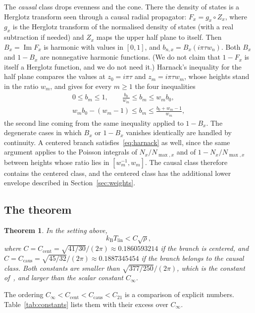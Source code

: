 \documentclass[10pt]{article}
\newtheorem{theorem}{Theorem}
\theoremstyle{remark}
\newcommand{\kB}{k_{\mathrm B}}
\newcommand{\Tlin}{T_{\mathrm{lin}}}
\newcommand{\Cinf}{C_\infty}
\newcommand{\Ccent}{C_{\mathrm{cent}}}
\newcommand{\Ccaus}{C_{\mathrm{caus}}}
\begin{document}
The \emph{causal} class drops evenness and the cone. There the density of states is a Herglotz transform seen through a causal radial propagator: $F_x=g_x\circ Z_x$, where $g_x$ is the Herglotz transform of the normalised density of states (with a real subtraction if needed) and $Z_x$ maps the upper half plane to itself. Then $B_x=\operatorname{Im}F_x$ is harmonic with values in $[0,1]$, and $b_{n,x}=B_x(i\pi\tau w_n)$. Both $B_x$ and $1-B_x$ are nonnegative harmonic functions. (We do not claim that $1-F_x$ is itself a Herglotz function, and we do not need it.) Harnack's inequality for the half plane compares the values at $z_0=i\pi\tau$ and $z_m=i\pi\tau w_m$, whose heights stand in the ratio $w_m$, and gives for every $m\ge1$ the four inequalities
\begin{equation}\label{eq:harnack}
\begin{gathered}
0\le b_m\le1,\qquad \frac{b_0}{w_m}\le b_m\le w_mb_0,\\
w_mb_0-(w_m-1)\le b_m\le\frac{b_0+w_m-1}{w_m},
\end{gathered}
\end{equation}
the second line coming from the same inequality applied to $1-B_x$. The degenerate cases in which $B_x$ or $1-B_x$ vanishes identically are handled by continuity. A centered branch satisfies~\eqref{eq:harnack} as well, since the same argument applies to the Poisson integrals of $N_x/N_{\max,x}$ and of $1-N_x/N_{\max,x}$ between heights whose ratio lies in $[w_m^{-1},w_m]$. The causal class therefore contains the centered class, and the centered class has the additional lower envelope described in Section~\ref{sec:weights}.

\subsection{The theorem}

\begin{theorem}\label{thm:main}
In the setting above,
\[
\kB\Tlin<C\sqrt{\rho},
\]
where $C=\Ccent=\sqrt{41/30}/(2\pi)\approx0.1860593214$ if the branch is centered, and $C=\Ccaus=\sqrt{45/32}/(2\pi)\approx0.1887345454$ if the branch belongs to the causal class. Both constants are smaller than $\sqrt{377/250}/(2\pi)$, which is the constant of~\cite{optimum}, and larger than the scalar constant $\Cinf$.
\end{theorem}

The ordering $\Cinf<\Ccent<\Ccaus<C_{21}$ is a comparison of explicit numbers. Table~\ref{tab:constants} lists them with their excess over $\Cinf$.
\end{document}
